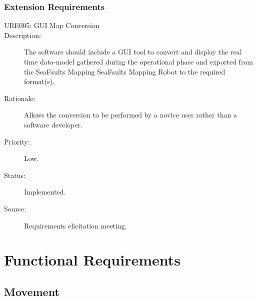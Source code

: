 \documentclass[12pt]{article}
\begin{document}
\subsubsection{Extension Requirements}
\begin{description}
\item [{URE005: GUI Map Conversion}\label{URE004}] 
\item [{Description: }\label{Description}] The software should include a GUI tool to convert and display the real time data-model gathered during the operational phase and exported from the SeaFaults Mapping SeaFaults Mapping Robot to the required format(s).
\item[{Rationale: }\label{Rationale}]  Allows the conversion to be performed by a novice user rather than a software developer.
\item[{Priority: }\label{Priority}] Low.
\item[{Status: }\label{Status}] Implemented.
\item[{Source: }\label{Source}] Requirements elicitation meeting.

\end{description}

\section{Functional Requirements}\label{funcrec}
\subsection{Movement}
\end{document}
